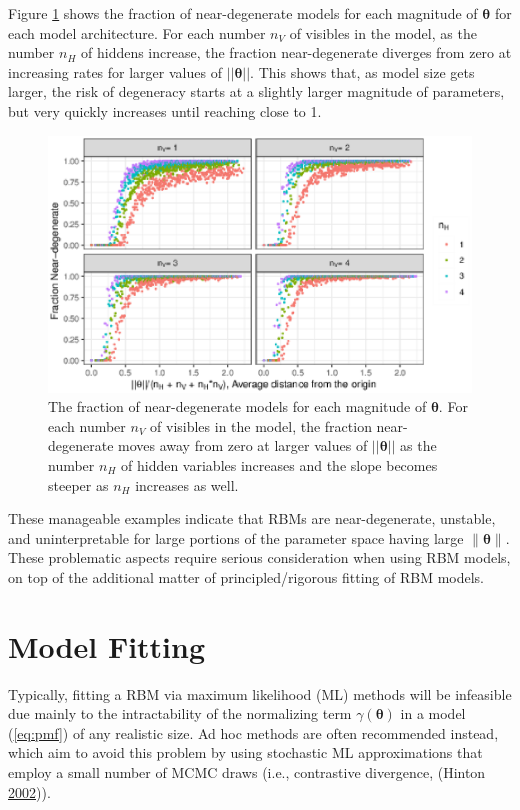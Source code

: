 \documentclass[12pt]{article}
\theoremstyle{definition}
\newcommand{\nv}{{n_{\scriptscriptstyle V}}}
\newcommand{\nh}{{n_{\scriptscriptstyle H}}}
\begin{document}
Figure \ref{fig:split-plots-dist} shows the fraction of near-degenerate
models for each magnitude of \(\boldsymbol \theta\) for each model
architecture. For each number \(\nv\) of visibles in the model, as the
number \(\nh\) of hiddens increase, the fraction near-degenerate
diverges from zero at increasing rates for larger values of
\(||\boldsymbol \theta||\). This shows that, as model size gets larger,
the risk of degeneracy starts at a slightly larger magnitude of
parameters, but very quickly increases until reaching close to 1. \par
\begin{figure}
\includegraphics{paper_files/figure-latex/split-plots-dist-1} \caption{The fraction of near-degenerate models for each magnitude of $\boldsymbol \theta$. For each number $\nv$ of visibles in the model, the fraction near-degenerate moves away from zero at larger values of $||\boldsymbol \theta||$ as the number $\nh$ of hidden variables increases and the slope becomes steeper as $\nh$ increases as well.}\label{fig:split-plots-dist}
\end{figure}
These manageable examples indicate that RBMs are near-degenerate,
unstable, and uninterpretable for large portions of the parameter space
having large \(\|\boldsymbol \theta\|\). These problematic aspects
require serious consideration when using RBM models, on top of the
additional matter of principled/rigorous fitting of RBM models.

\section{Model Fitting}\label{model-fitting}

Typically, fitting a RBM via maximum likelihood (ML) methods will be
infeasible due mainly to the intractability of the normalizing term
\(\gamma(\boldsymbol \theta)\) in a model (\eqref{eq:pmf}) of any
realistic size. Ad hoc methods are often recommended instead, which aim
to avoid this problem by using stochastic ML approximations that employ
a small number of MCMC draws (i.e., contrastive divergence, (Hinton
\protect\hyperlink{ref-hinton2002training}{2002})).
\end{document}
